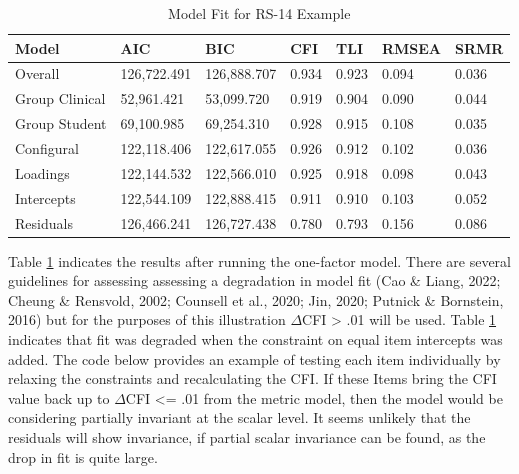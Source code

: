 \documentclass[
  man]{apa7}
\begin{document}
\begin{table}[tbp]

\begin{center}
\begin{threeparttable}

\caption{\label{tab:rs-table}Model Fit for RS-14 Example}

\begin{tabular}{lllllll}
\toprule
Model & AIC & BIC & CFI & TLI & RMSEA & SRMR\\
\midrule
Overall & 126,722.491 & 126,888.707 & 0.934 & 0.923 & 0.094 & 0.036\\
Group Clinical & 52,961.421 & 53,099.720 & 0.919 & 0.904 & 0.090 & 0.044\\
Group Student & 69,100.985 & 69,254.310 & 0.928 & 0.915 & 0.108 & 0.035\\
Configural & 122,118.406 & 122,617.055 & 0.926 & 0.912 & 0.102 & 0.036\\
Loadings & 122,144.532 & 122,566.010 & 0.925 & 0.918 & 0.098 & 0.043\\
Intercepts & 122,544.109 & 122,888.415 & 0.911 & 0.910 & 0.103 & 0.052\\
Residuals & 126,466.241 & 126,727.438 & 0.780 & 0.793 & 0.156 & 0.086\\
\bottomrule
\end{tabular}

\end{threeparttable}
\end{center}

\end{table}

Table \ref{tab:rs-table} indicates the results after running the one-factor model. There are several guidelines for assessing assessing a degradation in model fit (Cao \& Liang, 2022; Cheung \& Rensvold, 2002; Counsell et al., 2020; Jin, 2020; Putnick \& Bornstein, 2016) but for the purposes of this illustration \(\Delta\)CFI \textgreater{} .01 will be used. Table \ref{tab:rs-table} indicates that fit was degraded when the constraint on equal item intercepts was added. The code below provides an example of testing each item individually by relaxing the constraints and recalculating the CFI. If these Items bring the CFI value back up to \(\Delta\)CFI \textless= .01 from the metric model, then the model would be considering partially invariant at the scalar level. It seems unlikely that the residuals will show invariance, if partial scalar invariance can be found, as the drop in fit is quite large.
\end{document}
